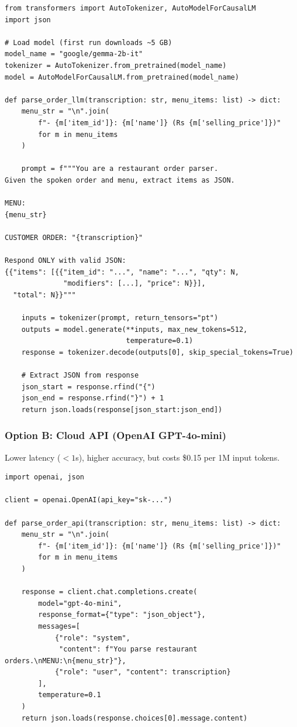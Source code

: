 \documentclass[12pt, a4paper]{article}
\begin{document}
\begin{lstlisting}
from transformers import AutoTokenizer, AutoModelForCausalLM
import json

# Load model (first run downloads ~5 GB)
model_name = "google/gemma-2b-it"
tokenizer = AutoTokenizer.from_pretrained(model_name)
model = AutoModelForCausalLM.from_pretrained(model_name)

def parse_order_llm(transcription: str, menu_items: list) -> dict:
    menu_str = "\n".join(
        f"- {m['item_id']}: {m['name']} (Rs {m['selling_price']})"
        for m in menu_items
    )
    
    prompt = f"""You are a restaurant order parser.
Given the spoken order and menu, extract items as JSON.

MENU:
{menu_str}

CUSTOMER ORDER: "{transcription}"

Respond ONLY with valid JSON:
{{"items": [{{"item_id": "...", "name": "...", "qty": N,
              "modifiers": [...], "price": N}}], 
  "total": N}}"""
    
    inputs = tokenizer(prompt, return_tensors="pt")
    outputs = model.generate(**inputs, max_new_tokens=512,
                             temperature=0.1)
    response = tokenizer.decode(outputs[0], skip_special_tokens=True)
    
    # Extract JSON from response
    json_start = response.rfind("{")
    json_end = response.rfind("}") + 1
    return json.loads(response[json_start:json_end])
\end{lstlisting}


\subsubsection{Option B: Cloud API (OpenAI GPT-4o-mini)}

Lower latency ($<1$s), higher accuracy, but costs \$0.15 per 1M input tokens.

\begin{lstlisting}
import openai, json

client = openai.OpenAI(api_key="sk-...")

def parse_order_api(transcription: str, menu_items: list) -> dict:
    menu_str = "\n".join(
        f"- {m['item_id']}: {m['name']} (Rs {m['selling_price']})"
        for m in menu_items
    )
    
    response = client.chat.completions.create(
        model="gpt-4o-mini",
        response_format={"type": "json_object"},
        messages=[
            {"role": "system",
             "content": f"You parse restaurant orders.\nMENU:\n{menu_str}"},
            {"role": "user", "content": transcription}
        ],
        temperature=0.1
    )
    return json.loads(response.choices[0].message.content)
\end{lstlisting}
\end{document}

